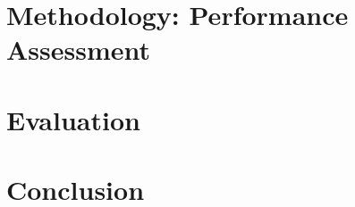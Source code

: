 \documentclass[
	12pt,
	a4paper,
	oneside,
	openright,
	listof=totoc%
]{scrbook}
\begin{document}
\chapter{Methodology: Performance Assessment}\label{chapter:5}


\chapter{Evaluation} \label{chapter:6}


%

\chapter{Conclusion}\label{chapter:7}
\clearpage


\end{document}

